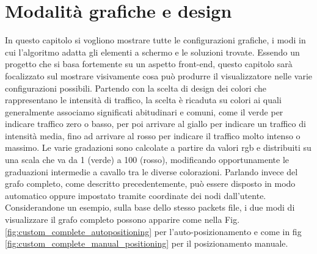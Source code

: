 \documentclass[binding=0.6cm]{sapthesis}
\begin{document}
\section{Modalità grafiche e design}
In questo capitolo si vogliono mostrare tutte le configurazioni grafiche, i modi in cui l'algoritmo adatta gli elementi a schermo e le soluzioni trovate.
Essendo un progetto che si basa fortemente su un aspetto front-end, questo capitolo sarà focalizzato sul mostrare visivamente cosa può produrre il visualizzatore nelle varie configurazioni possibili.
Partendo con la scelta di design dei colori che rappresentano le intensità di traffico, la scelta è ricaduta su colori ai quali generalmente associamo significati abitudinari e comuni,
come il verde per indicare traffico zero o basso, per poi arrivare al giallo per indicare un traffico di intensità media, fino ad arrivare al rosso
per indicare il traffico molto intenso o massimo. Le varie gradazioni sono calcolate a partire da valori rgb e distribuiti su una scala che va da 1 (verde) a 100 (rosso), modificando opportunamente le graduazioni intermedie a cavallo tra le diverse colorazioni.
Parlando invece del grafo completo, come descritto precedentemente, può essere disposto in modo automatico oppure impostato tramite coordinate dei nodi dall'utente. 
Considerandone un esempio, sulla base dello stesso packets file, i due modi di visualizzare il grafo completo possono apparire come nella Fig. \ref{fig:custom_complete_autopositioning} per l'auto-posizionamento e come in fig \ref{fig:custom_complete_manual_positioning} per il posizionamento manuale.
\end{document}
